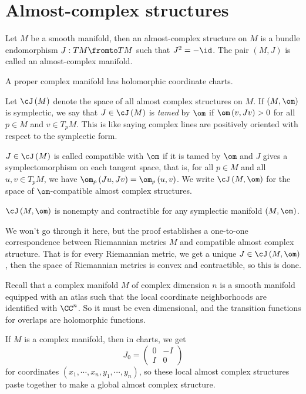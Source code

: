 \documentclass{amsart}
\begin{document}
\section{Almost-complex structures}

\begin{defn}
Let $M$ be a smooth manifold, then an almost-complex structure on $M$ is a bundle endomorphism
$J:TM \fromto TM$ such that $J^2 = -\id$.
The pair $\left( M , J \right)$ is called an almost-complex manifold.
\end{defn}

\begin{rmk}
A proper complex manifold has holomorphic coordinate charts.
\end{rmk}

Let $\cJ\left( M \right)$ denote the space of all almost complex structures on $M$.
If $\left( M , \om \right)$ is symplectic, we say that $J\in \cJ\left( M \right)$
is \emph{tamed} by $\om$ if $\om\left( v , Jv \right) > 0$
for all $p\in M$ and $v\in T_pM$. 
This is like saying complex lines are positively oriented with respect to the symplectic form.

$J\in \cJ\left( M \right)$ is called compatible with $\om$ if it is tamed by $\om$ and
$J$ gives a symplectomorphism on each tangent space, that is, 
for all $p\in M$ and all $u,v\in T_p M$, we have
$\om_p\left( Ju , Jv \right) = \om_p\left( u , v \right)$. 
We write $\cJ\left( M , \om \right)$ for the space of $\om$-compatible almost complex structures.

\begin{thm}
$\cJ\left( M , \om \right)$ is nonempty and contractible for any symplectic manifold $\left( M , \om \right)$.
\end{thm}

We won't go through it here, but the proof establishes a one-to-one correspondence between
Riemannian metrics $M$ and compatible almost complex structure.
That is for every Riemannian metric, we get a unique $J\in \cJ\left( M , \om \right)$, then the space of 
Riemannian metrics is convex and contractible, so this is done.

Recall that a complex manifold $M$ of complex dimension $n$
is a smooth manifold equipped with an atlas such that the local coordinate neighborhoods are 
identified with $\CC^n$. 
So it must be even dimensional, and the transition functions for overlaps
are holomorphic functions.

\begin{clm}
If $M$ is a complex manifold, then in charts, we get
\begin{equation}
J_0 = 
\begin{pmatrix}
0 & -I \\ I & 0
\end{pmatrix}
\end{equation}
for coordinates $\left( x_1 , \cdots , x_n , y_1 , \cdots , y_n \right)$,
so these local almost complex structures paste together to make a global almost complex structure.
\end{clm}
\end{document}
